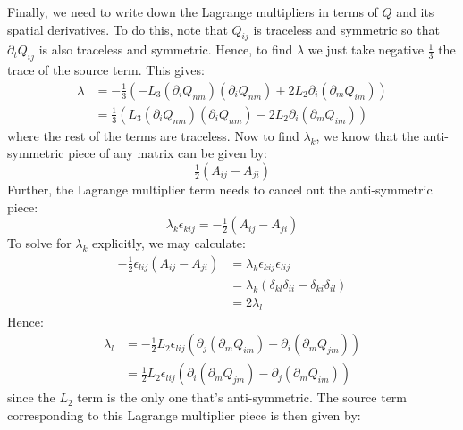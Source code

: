 \documentclass[reqno]{article}
\begin{document}
	Finally, we need to write down the Lagrange multipliers in terms of $Q$ and its spatial derivatives.
	To do this, note that $Q_{ij}$ is traceless and symmetric so that $\partial_t Q_{ij}$ is also traceless and symmetric.
	Hence, to find $\lambda$ we just take negative $\tfrac13$ the trace of the source term.
	This gives:
	\begin{equation}
	\begin{split}
		\lambda
		&= -\tfrac13 \left(
		- L_3 (\partial_i Q_{nm}) (\partial_i Q_{nm})
		+ 2 L_2 \partial_i ( \partial_m Q_{im} )
		\right) \\
		&= \tfrac13 \left( 
		L_3 (\partial_i Q_{nm}) (\partial_i Q_{nm})
		- 2 L_2 \partial_i ( \partial_m Q_{im} )
		\right)
	\end{split}
	\end{equation}
	where the rest of the terms are traceless.
	Now to find $\lambda_k$, we know that the anti-symmetric piece of any matrix can be given by:
	\begin{equation}
		\tfrac12 \left( A_{ij} - A_{ji} \right)
	\end{equation}
	Further, the Lagrange multiplier term needs to cancel out the anti-symmetric piece:
	\begin{equation}
		\lambda_k \epsilon_{kij} = -\tfrac12 \left( A_{ij} - A_{ji} \right)
	\end{equation}
	To solve for $\lambda_k$ explicitly, we may calculate:
	\begin{equation}
	\begin{split}
		-\tfrac12 \epsilon_{lij} \left( A_{ij} - A_{ji} \right)
		&= \lambda_k \epsilon_{kij} \epsilon_{lij} \\
		&= \lambda_k \left( \delta_{kl} \delta_{ii} - \delta_{ki} \delta_{il} \right) \\
		&= 2 \lambda_l
	\end{split}
	\end{equation}
	Hence:
	\begin{equation}
	\begin{split}
		\lambda_l 
		&= -\tfrac12 L_2 \epsilon_{lij} \left( \partial_j (\partial_m Q_{im}) - \partial_i (\partial_m Q_{jm}) \right) \\
		&= \tfrac12 L_2 \epsilon_{lij} \left( \partial_i (\partial_m Q_{jm})
		- \partial_j (\partial_m Q_{im}) \right)
	\end{split}
	\end{equation}
	since the $L_2$ term is the only one that's anti-symmetric.
	The source term corresponding to this Lagrange multiplier piece is then given by:
\end{document}
